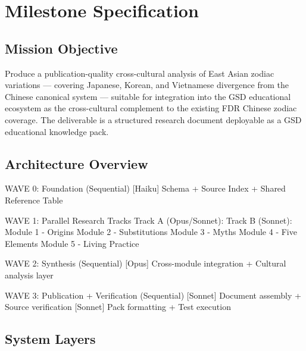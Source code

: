 \documentclass[11pt,letterpaper]{article}
\newcommand{\stageheader}[2]{%
  \noindent\colorbox{#2}{\makebox[\textwidth][l]{%
    \textcolor{white}{\bfseries\sffamily\hspace{6pt}#1\hspace{6pt}}}}%
  \vspace{0.5em}\par%
}
\begin{document}
\newpage

\stageheader{STAGE 3 --- MISSION PACKAGE}{tertiary}

\section{Milestone Specification}

\subsection{Mission Objective}

Produce a publication-quality cross-cultural analysis of East Asian zodiac variations --- covering Japanese, Korean, and Vietnamese divergence from the Chinese canonical system --- suitable for integration into the GSD educational ecosystem as the cross-cultural complement to the existing FDR Chinese zodiac coverage. The deliverable is a structured research document deployable as a GSD educational knowledge pack.

\subsection{Architecture Overview}

\begin{asciibox}
WAVE 0: Foundation (Sequential)
  [Haiku] Schema + Source Index + Shared Reference Table

WAVE 1: Parallel Research Tracks
  Track A (Opus/Sonnet):       Track B (Sonnet):
  Module 1 - Origins           Module 2 - Substitutions
  Module 3 - Myths             Module 4 - Five Elements
                               Module 5 - Living Practice

WAVE 2: Synthesis (Sequential)
  [Opus] Cross-module integration + Cultural analysis layer

WAVE 3: Publication + Verification (Sequential)
  [Sonnet] Document assembly + Source verification
  [Sonnet] Pack formatting + Test execution
\end{asciibox}

\subsection{System Layers}
\end{document}
